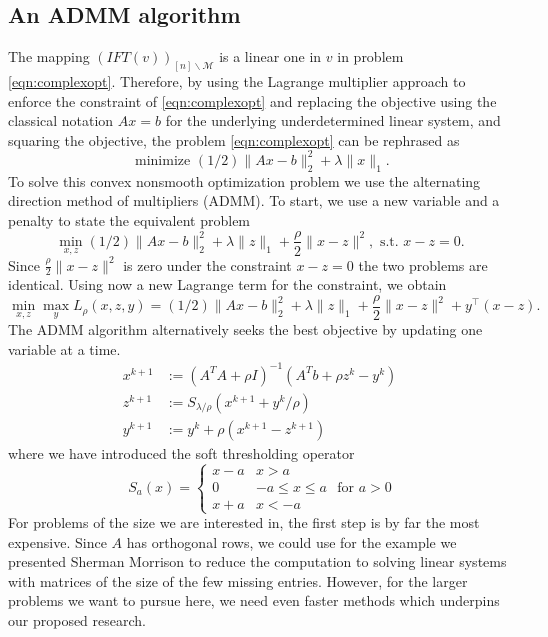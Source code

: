 \documentclass[final,onefignum,onetabnum]{siamart190516}
\newcounter{example}
\begin{document}
\subsection{An ADMM algorithm} The mapping $\left(IFT(v)\right)_{[n]\backslash\mathcal{M}}$ is a linear one in $v$ in problem \eqref{eqn:complexopt}. Therefore, by using the Lagrange multiplier approach to enforce the constraint of \eqref{eqn:complexopt} and replacing the objective using the classical notation $Ax=b$ for the underlying underdetermined linear system, and squaring the objective, the problem \eqref{eqn:complexopt} can be rephrased as 
\begin{equation} \label{}
    \text { minimize }(1 / 2)\|A x-b\|_{2}^{2}+\lambda\|x\|_{1}.
\end{equation}
To solve this convex nonsmooth optimization problem we use the alternating direction method of multipliers (ADMM). 
To start, we use a new variable and a penalty to state the equivalent problem
\begin{equation}
    \min_{x, z}(1 / 2)\|A x-b\|_{2}^{2}+\lambda\|z\|_{1} + \frac{\rho}{2}\|x-z\|^2,\text{ s.t. }x - z = 0.
\end{equation}
Since $\frac{\rho}{2}\|x-z\|^2$ is zero under the constraint $x - z = 0$ the two problems are identical. Using now a new Lagrange term for the constraint, we obtain
\begin{equation}
    \min_{x,z}\max_{y} L_{\rho}(x,z,y) = (1 / 2)\|A x-b\|_{2}^{2}+\lambda\|z\|_{1} + \frac{\rho}{2}\|x-z\|^2 + y^{\top}(x-z).
\end{equation}
The ADMM algorithm alternatively seeks the best objective by updating one variable at a time. 
\begin{equation}
    \begin{aligned}
x^{k+1} &:=\left(A^{T} A+\rho I\right)^{-1}\left(A^{T} b+\rho z^{k}-y^{k}\right) \\
z^{k+1} &:=S_{\lambda / \rho}\left(x^{k+1}+y^{k} / \rho\right) \\
y^{k+1} &:=y^{k}+\rho\left(x^{k+1}-z^{k+1}\right)
\end{aligned}
\end{equation}
where we have introduced the soft thresholding operator
\begin{equation}
S_{a}(x) = \begin{cases}x-a & x > a \\ 0 & -a\leq x\leq a\\ x+a & x<-a\end{cases}   \text{ for }a>0
\end{equation}
For problems of the size we are interested in, the first step is by far the most expensive. Since $A$ has orthogonal rows, we could use for the example we presented Sherman Morrison to reduce the computation to solving linear systems with matrices of the size of the few missing entries.  
However, for the larger problems we want to pursue here, we need even faster methods which underpins our proposed research. 
\end{document}
